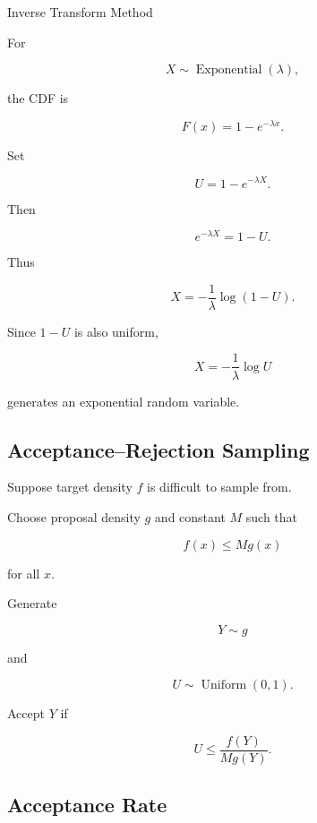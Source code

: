 \begin{workedexamplebox}{Inverse Transform Method}

For

\[
X
\sim
\operatorname{Exponential}(\lambda),
\]

the CDF is

\[
F(x)
=
1-e^{-\lambda x}.
\]

Set

\[
U
=
1-e^{-\lambda X}.
\]

Then

\[
e^{-\lambda X}
=
1-U.
\]

Thus

\[
X
=
-\frac1\lambda
\log(1-U).
\]

Since \(1-U\) is also uniform,

\begin{answerbox}
\[
\boxed{
X
=
-\frac1\lambda
\log U
}
\]

generates an exponential random variable.
\end{answerbox}

\end{workedexamplebox}

\subsection{Acceptance--Rejection Sampling}
\label{subsec:acceptance-rejection}

Suppose target density \(f\) is difficult to sample from.

Choose proposal density \(g\) and constant \(M\) such that

\[
\boxed{
f(x)
\leq
Mg(x)
}
\]

for all \(x\).

Generate

\[
Y\sim g
\]

and

\[
U\sim
\operatorname{Uniform}(0,1).
\]

Accept \(Y\) if

\[
\boxed{
U
\leq
\frac{
f(Y)
}{
Mg(Y)
}.
}
\]

\subsection{Acceptance Rate}
\label{subsec:acceptance-rejection-rate}

